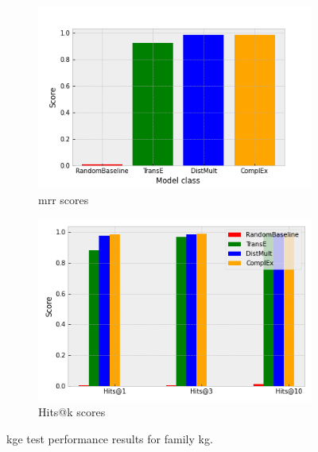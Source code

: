 \begin{figure}[htbp]
\centering
\begin{subfigure}{.5\textwidth}
  \centering
  \includegraphics[width=1\linewidth]{figures/model_selection/family_mrr.png}
  \caption{\gls{mrr} scores}
  \label{fig:model_selection_mrr_family}
\end{subfigure}%
\begin{subfigure}{.5\textwidth}
  \centering
  \includegraphics[width=1\linewidth]{figures/model_selection/family_hit_scores.png}
  \caption{Hits@k scores}
  \label{fig:model_selection_hit_scores_family}
\end{subfigure}
\caption[KGE test results for family KG.]{\gls{kge} test performance results for family \gls{kg}.}
\label{fig:model_selection_metrics_family}
\end{figure}

